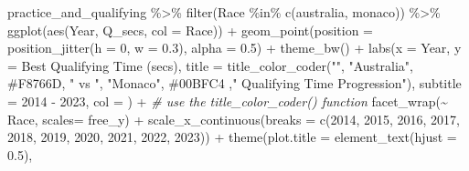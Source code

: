 \documentclass[
]{book}
\newenvironment{Shaded}{\begin{snugshade}}{\end{snugshade}}
\newcommand{\AttributeTok}[1]{\textcolor[rgb]{0.77,0.63,0.00}{#1}}
\newcommand{\CommentTok}[1]{\textcolor[rgb]{0.56,0.35,0.01}{\textit{#1}}}
\newcommand{\DecValTok}[1]{\textcolor[rgb]{0.00,0.00,0.81}{#1}}
\newcommand{\FloatTok}[1]{\textcolor[rgb]{0.00,0.00,0.81}{#1}}
\newcommand{\FunctionTok}[1]{\textcolor[rgb]{0.00,0.00,0.00}{#1}}
\newcommand{\NormalTok}[1]{#1}
\newcommand{\SpecialCharTok}[1]{\textcolor[rgb]{0.00,0.00,0.00}{#1}}
\newcommand{\StringTok}[1]{\textcolor[rgb]{0.31,0.60,0.02}{#1}}
\begin{document}
\begin{Shaded}
\begin{Highlighting}[]
\NormalTok{practice\_and\_qualifying }\SpecialCharTok{\%\textgreater{}\%}
  \FunctionTok{filter}\NormalTok{(Race }\SpecialCharTok{\%in\%} \FunctionTok{c}\NormalTok{(}\StringTok{\textquotesingle{}australia\textquotesingle{}}\NormalTok{, }\StringTok{\textquotesingle{}monaco\textquotesingle{}}\NormalTok{)) }\SpecialCharTok{\%\textgreater{}\%}
  \FunctionTok{ggplot}\NormalTok{(}\FunctionTok{aes}\NormalTok{(Year, Q\_secs, }\AttributeTok{col =}\NormalTok{ Race)) }\SpecialCharTok{+}
  \FunctionTok{geom\_point}\NormalTok{(}\AttributeTok{position =} \FunctionTok{position\_jitter}\NormalTok{(}\AttributeTok{h =} \DecValTok{0}\NormalTok{, }\AttributeTok{w =} \FloatTok{0.3}\NormalTok{), }\AttributeTok{alpha =} \FloatTok{0.5}\NormalTok{) }\SpecialCharTok{+}
  \FunctionTok{theme\_bw}\NormalTok{() }\SpecialCharTok{+}
  \FunctionTok{labs}\NormalTok{(}\AttributeTok{x =} \StringTok{\textquotesingle{}Year\textquotesingle{}}\NormalTok{,}
       \AttributeTok{y =} \StringTok{\textquotesingle{}Best Qualifying Time (secs)\textquotesingle{}}\NormalTok{,}
       \AttributeTok{title =} \FunctionTok{title\_color\_coder}\NormalTok{(}\StringTok{""}\NormalTok{, }\StringTok{"Australia"}\NormalTok{, }\StringTok{\textquotesingle{}\#F8766D\textquotesingle{}}\NormalTok{, }\StringTok{" vs "}\NormalTok{, }\StringTok{"Monaco"}\NormalTok{, }\StringTok{\textquotesingle{}\#00BFC4\textquotesingle{}}\NormalTok{ ,}\StringTok{" Qualifying Time Progression"}\NormalTok{), }
       \AttributeTok{subtitle =} \StringTok{\textquotesingle{}2014 {-} 2023\textquotesingle{}}\NormalTok{,}
       \AttributeTok{col =} \StringTok{\textquotesingle{}\textquotesingle{}}\NormalTok{) }\SpecialCharTok{+} \CommentTok{\# use the title\_color\_coder() function}
  \FunctionTok{facet\_wrap}\NormalTok{(}\SpecialCharTok{\textasciitilde{}}\NormalTok{ Race, }\AttributeTok{scales=} \StringTok{\textquotesingle{}free\_y\textquotesingle{}}\NormalTok{) }\SpecialCharTok{+}
  \FunctionTok{scale\_x\_continuous}\NormalTok{(}\AttributeTok{breaks =} \FunctionTok{c}\NormalTok{(}\DecValTok{2014}\NormalTok{, }\DecValTok{2015}\NormalTok{, }\DecValTok{2016}\NormalTok{, }\DecValTok{2017}\NormalTok{, }\DecValTok{2018}\NormalTok{, }\DecValTok{2019}\NormalTok{, }\DecValTok{2020}\NormalTok{, }\DecValTok{2021}\NormalTok{, }\DecValTok{2022}\NormalTok{, }\DecValTok{2023}\NormalTok{)) }\SpecialCharTok{+} 
  \FunctionTok{theme}\NormalTok{(}\AttributeTok{plot.title =} \FunctionTok{element\_text}\NormalTok{(}\AttributeTok{hjust =} \FloatTok{0.5}\NormalTok{),}

\end{Highlighting}
\end{Shaded}
\end{document}
